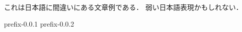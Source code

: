 \documentclass[uplatex]{jsarticle}
\begin{document}
これは日本語に間違いにある文章例である．
弱い日本語表現かもしれない．

prefix-0.0.1
prefix-0.0.2
\end{document}
